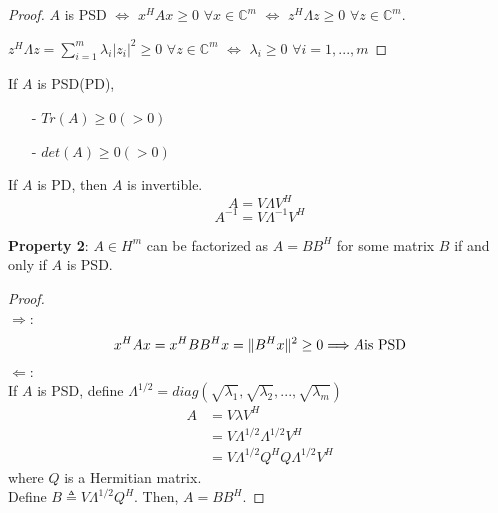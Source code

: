 \begin{multicols}{2}
\begin{proof}
    $A$ is PSD $\Longleftrightarrow$ $x^HAx\geq 0$ $\forall x\in\mathbb{C}^m$ $\Longleftrightarrow$ $z^H\Lambda z\geq 0$ $\forall z\in\mathbb{C}^m$.

    $z^H\Lambda z=\sum_{i=1}^m \lambda_i |z_i|^2 \geq 0$ $\forall z\in\mathbb{C}^m$ $\Longleftrightarrow$ $\lambda_i\geq 0$ $\forall i=1,...,m$
\end{proof}

If $A$ is PSD(PD),
\begin{itemize}
    \item [-] $Tr(A)\geq 0 (>0)$
    \item [-] $det(A) \geq 0 (>0)$
\end{itemize}

If $A$ is PD, then $A$ is invertible.
\[
    A = V\Lambda V^H
\]
\[
    A^{-1} = V\Lambda^{-1} V^H
\]

\textbf{Property 2}: $A\in H^m$ can be factorized as $A=BB^H$ for some matrix $B$ if and only if $A$ is PSD. \\
\begin{proof} \\
    $\Longrightarrow$:
    \[
        x^HAx = x^HBB^Hx = \|B^Hx\|^2 \geq 0 \Longrightarrow A \text{\rm is PSD}
    \]
    $\Longleftarrow$:\\
    If $A$ is PSD, define $\Lambda^{1/2}=diag(\sqrt{\lambda_1},\sqrt{\lambda_2},...,\sqrt{\lambda_m})$
    \[
        \begin{array}{ll}
            A &= V\lambda V^H \\
            &= V\Lambda^{1/2}\Lambda^{1/2}V^H \\
            &= V\Lambda^{1/2}Q^HQ\Lambda^{1/2}V^H
        \end{array}
    \]
    where $Q$ is a Hermitian matrix. \\
    Define $B\triangleq V\Lambda^{1/2}Q^H$. Then, $A=BB^H$.
\end{proof}


\end{multicols}
